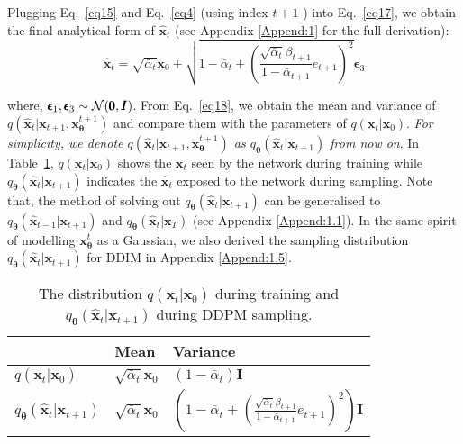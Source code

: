 \documentclass{article} \usepackage{iclr2024_conference,times}
\begin{document}
\noindent
Plugging Eq.~\ref{eq15} and Eq.~\ref{eq4} (using index $t+1$ ) into Eq.~\ref{eq17}, we obtain the final analytical form of $\hat{\pmb{x}}_{t}$ (see Appendix \ref{Append:1} for the full derivation):
\noindent
\begin{equation}
\label{eq18}
\hat{\pmb{x}}_{t} = \sqrt{\bar{\alpha}_t} \pmb{x}_0 + \sqrt{1-\bar{\alpha}_t + (\frac{\sqrt{\bar{\alpha}_t} \beta_{t+1}}{1-\bar{\alpha}_{t+1}} e_{t+1})^2 } \pmb{\epsilon}_3
\end{equation}

\noindent
where, $\pmb{\epsilon}_1, \pmb{\epsilon}_3 \sim {\cal N} (\pmb{0}, \pmb{I})$. From Eq.~\ref{eq18}, we obtain the mean and variance of $q(\hat{\pmb{x}}_{t} | \pmb{x}_{t+1}, \pmb{x}^{t+1}_{\pmb{\theta}})$ and compare them with the parameters of $q(\pmb{x}_{t} | \pmb{x}_0)$. \textit{For simplicity, we denote $q(\hat{\pmb{x}}_{t} | \pmb{x}_{t+1}, \pmb{x}^{t+1}_{\pmb{\theta}})$ as $q_{\pmb{\theta}}(\hat{\pmb{x}}_{t} | \pmb{x}_{t+1})$ from now on}. In Table~\ref{tab: sampling distribution}, $q(\pmb{x}_{t} | \pmb{x}_0)$ shows the $\pmb{x}_{t}$ seen by the network during training while $q_{\pmb{\theta}}(\hat{\pmb{x}}_{t} | \pmb{x}_{t+1})$ indicates the $\hat{\pmb{x}}_{t}$ exposed to the network during sampling. Note that, the method of solving out $q_{\pmb{\theta}}(\hat{\pmb{x}}_{t} | \pmb{x}_{t+1})$ can be generalised to $q_{\pmb{\theta}}(\hat{\pmb{x}}_{t-1} | \pmb{x}_{t+1})$ and $q_{\pmb{\theta}}(\hat{\pmb{x}}_{t} | \pmb{x}_{T})$ (see Appendix \ref{Append:1.1}). In the same spirit of modelling $\pmb{x}^{t}_{\pmb{\theta}}$ as a Gaussian, we also derived the sampling distribution $q_{\pmb{\theta}}(\hat{\pmb{x}}_{t} | \pmb{x}_{t+1})$ for DDIM \citep{DDIM} in Appendix \ref{Append:1.5}. 

\begin{table}[ht]
\vskip -0.1in
\captionsetup{skip=2pt}
\caption{
The distribution $q(\pmb{x}_{t} | \pmb{x}_0)$ during training and $q_{\pmb{\theta}}(\hat{\pmb{x}}_{t} | \pmb{x}_{t+1})$ during DDPM sampling.}
\label{tab: sampling distribution}
\begin{center}
\begin{tabular}{@{}lll@{}}
\toprule
 & Mean & Variance \\ \midrule
$q(\pmb{x}_{t} | \pmb{x}_0)$ & $\sqrt{\bar{\alpha}_t} \pmb{x}_0$ & $(1-\bar{\alpha}_t) \pmb{I}$ \\
$q_{\pmb{\theta}}(\hat{\pmb{x}}_{t} | \pmb{x}_{t+1})$  & $\sqrt{\bar{\alpha}_t} \pmb{x}_0$ & $(1-\bar{\alpha}_t + (\frac{\sqrt{\bar{\alpha}_t} \beta_{t+1}}{1-\bar{\alpha}_{t+1}} e_{t+1})^2) \pmb{I}$ \\ \bottomrule
\end{tabular}
\end{center}
\vskip -0.2in
\end{table}
\end{document}
